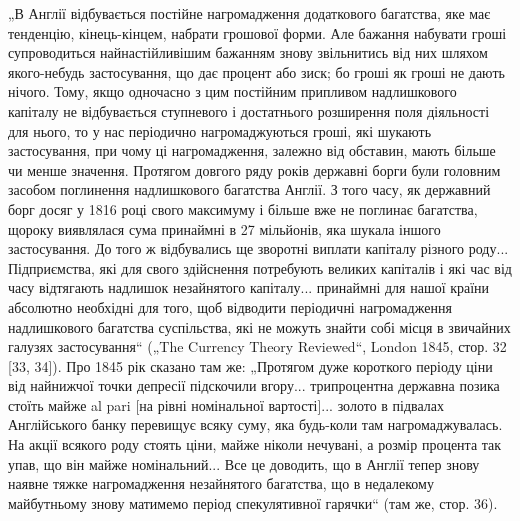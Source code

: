 „В Англії відбувається постійне нагромадження додаткового
багатства, яке має тенденцію, кінець-кінцем, набрати грошової
форми. Але бажання набувати гроші супроводиться найнастійливішим бажанням знову звільнитись від них
шляхом якого-небудь
застосування, що дає процент або зиск; бо гроші як гроші не
дають нічого. Тому, якщо одночасно з цим постійним припливом надлишкового капіталу не відбувається
ступневого і достатнього розширення поля діяльності для нього, то у нас
періодично нагромаджуються гроші, які шукають застосування,
при чому ці нагромадження, залежно від обставин, мають
більше чи менше значення. Протягом довгого ряду років державні борги були головним засобом
поглинення надлишкового
багатства Англії. З того часу, як державний борг досяг у
1816 році свого максимуму і більше вже не поглинає багатства, щороку виявлялася сума принаймні в 27
мільйонів, яка
шукала іншого застосування. До того ж відбувались ще зворотні
виплати капіталу різного роду... Підприємства, які для свого
здійснення потребують великих капіталів і які час від часу
відтягають надлишок незайнятого капіталу... принаймні для нашої країни абсолютно необхідні для того,
щоб відводити періодичні нагромадження надлишкового багатства суспільства, які не
можуть знайти собі місця в звичайних галузях застосування“
(„The Currency Theory Reviewed“, London 1845, стор. 32 [33, 34]).
Про 1845 рік сказано там же: „Протягом дуже короткого періоду ціни від найнижчої точки депресії
підскочили вгору... трипроцентна державна позика стоїть майже al pari [на рівні номінальної
вартості]... золото в підвалах Англійського банку перевищує всяку суму, яка будь-коли там
нагромаджувалась. На
акції всякого роду стоять ціни, майже ніколи нечувані, а розмір
процента так упав, що він майже номінальний... Все це доводить,
що в Англії тепер знову наявне тяжке нагромадження незайнятого
багатства, що в недалекому майбутньому знову матимемо період
спекулятивної гарячки“ (там же, стор. 36).

